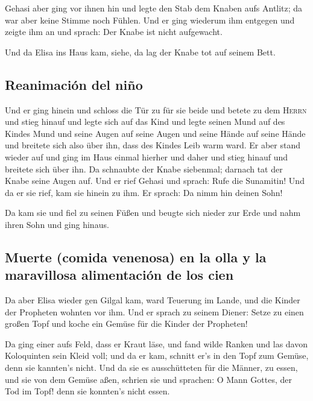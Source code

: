  Gehasi aber ging vor ihnen hin und legte den Stab dem
Knaben aufs Antlitz; da war aber keine Stimme noch Fühlen. Und er ging
wiederum ihm entgegen und zeigte ihm an und sprach: Der Knabe ist nicht
aufgewacht.

 Und da Elisa ins Haus kam, siehe, da lag der Knabe tot
auf seinem Bett.

\hypertarget{reanimaciuxf3n-del-niuxf1o}{%
\subsection{Reanimación del niño}\label{reanimaciuxf3n-del-niuxf1o}}

 Und er ging hinein und schloss die Tür zu für sie beide
und betete zu dem \textsc{Herrn}  und stieg hinauf und
legte sich auf das Kind und legte seinen Mund auf des Kindes Mund und
seine Augen auf seine Augen und seine Hände auf seine Hände und breitete
sich also über ihn, dass des Kindes Leib warm ward.  Er
aber stand wieder auf und ging im Haus einmal hierher und daher und
stieg hinauf und breitete sich über ihn. Da schnaubte der Knabe
siebenmal; darnach tat der Knabe seine Augen auf.  Und er
rief Gehasi und sprach: Rufe die Sunamitin! Und da er sie rief, kam sie
hinein zu ihm. Er sprach: Da nimm hin deinen Sohn!

 Da kam sie und fiel zu seinen Füßen und beugte sich
nieder zur Erde und nahm ihren Sohn und ging hinaus.

\hypertarget{muerte-comida-venenosa-en-la-olla-y-la-maravillosa-alimentaciuxf3n-de-los-cien}{%
\subsection{Muerte (comida venenosa) en la olla y la maravillosa
alimentación de los
cien}\label{muerte-comida-venenosa-en-la-olla-y-la-maravillosa-alimentaciuxf3n-de-los-cien}}

 Da aber Elisa wieder gen Gilgal kam, ward Teuerung im
Lande, und die Kinder der Propheten wohnten vor ihm. Und er sprach zu
seinem Diener: Setze zu einen großen Topf und koche ein Gemüse für die
Kinder der Propheten!

 Da ging einer aufs Feld, dass er Kraut läse, und fand
wilde Ranken und las davon Koloquinten sein Kleid voll; und da er kam,
schnitt er's in den Topf zum Gemüse, denn sie kannten's nicht.
 Und da sie es ausschütteten für die Männer, zu essen,
und sie von dem Gemüse aßen, schrien sie und sprachen: O Mann Gottes,
der Tod im Topf! denn sie konnten's nicht essen.

